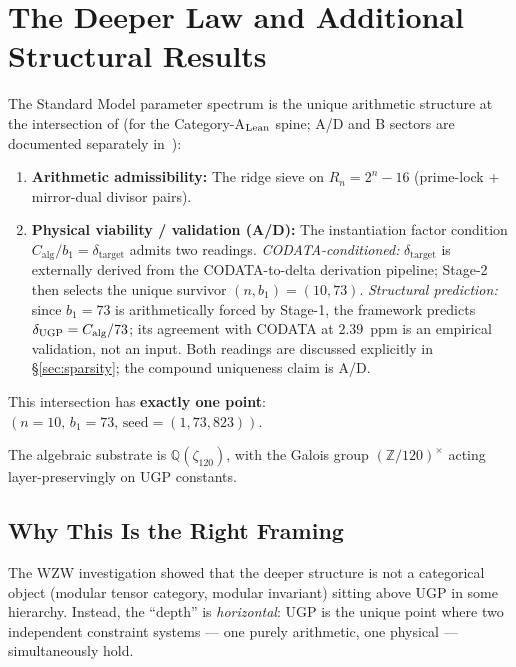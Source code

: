 \documentclass[11pt]{article}
\theoremstyle{remark}
\newcommand{\bone}{b_1}
\newcommand{\deltatar}{\delta_{\mathrm{target}}}
\newcommand{\Calg}{C_{\mathrm{alg}}}
\newcommand{\zetaN}[1]{\zeta_{#1}}
\begin{document}
\section{The Deeper Law and Additional Structural Results}
\label{sec:deeperlaw}

\begin{tcolorbox}[colback=blue!3!white, colframe=blue!50!black, title=The Deeper Law]
The Standard Model parameter spectrum is the unique arithmetic structure at the
intersection of (for the Category-A$_{\rm Lean}$ spine; A/D and B sectors are documented separately in~\cite{Spivack2026_SM_UGP}):
\begin{enumerate}[leftmargin=2em]
  \item \textbf{Arithmetic admissibility:}
    The ridge sieve on $R_n = 2^n - 16$ (prime-lock + mirror-dual divisor pairs).
  \item \textbf{Physical viability / validation (A/D):}
    The instantiation factor condition $\Calg/\bone = \deltatar$ admits two readings.
    \emph{CODATA-conditioned:} $\deltatar$ is externally derived from the CODATA-to-delta derivation pipeline; Stage-2 then selects the unique survivor $(n,b_1)=(10,73)$.
    \emph{Structural prediction:} since $b_1=73$ is arithmetically forced by Stage-1, the framework predicts $\delta_{\rm UGP}=\Calg/73$; its agreement with CODATA at $2.39$~ppm is an empirical validation, not an input.
    Both readings are discussed explicitly in \S\ref{sec:sparsity}; the compound uniqueness claim is A/D.
\end{enumerate}
This intersection has \textbf{exactly one point}: $(n{=}10,\, \bone{=}73,\, \mathrm{seed}=(1,73,823))$.

The algebraic substrate is $\mathbb{Q}(\zetaN{120})$, with the Galois group
$(\mathbb{Z}/120)^\times$ acting layer-preservingly on UGP constants.
\end{tcolorbox}

\subsection{Why This Is the Right Framing}

The WZW investigation showed that the deeper structure is not a categorical object
(modular tensor category, modular invariant) sitting above UGP in some hierarchy.
Instead, the ``depth'' is \emph{horizontal}: UGP is the unique point where two
independent constraint systems --- one purely arithmetic, one physical --- simultaneously hold.
\end{document}
